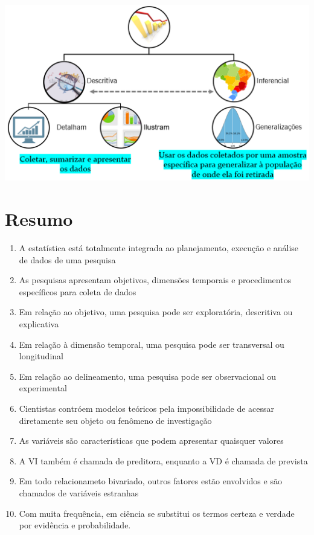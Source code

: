 \documentclass[
]{book}
\providecommand{\tightlist}{%
  \setlength{\itemsep}{0pt}\setlength{\parskip}{0pt}}
\begin{document}
\includegraphics{./img/cap_areas_estatistica.png}

\hypertarget{resumo-1}{%
\section{Resumo}\label{resumo-1}}

\begin{explore}

\begin{enumerate}
\def\labelenumi{\arabic{enumi}.}
\tightlist
\item
  A estatística está totalmente integrada ao planejamento, execução e análise de dados de uma pesquisa\\
\item
  As pesquisas apresentam objetivos, dimensões temporais e procedimentos específicos para coleta de dados\\
\item
  Em relação ao objetivo, uma pesquisa pode ser exploratória, descritiva ou explicativa\\
\item
  Em relação à dimensão temporal, uma pesquisa pode ser transversal ou longitudinal\\
\item
  Em relação ao delineamento, uma pesquisa pode ser observacional ou experimental\\
\item
  Cientistas contróem modelos teóricos pela impossibilidade de acessar diretamente seu objeto ou fenômeno de investigação\\
\item
  As variáveis são características que podem apresentar quaisquer valores\\
\item
  A VI também é chamada de preditora, enquanto a VD é chamada de prevista\\
\item
  Em todo relacionameto bivariado, outros fatores estão envolvidos e são chamados de variáveis estranhas\\
\item
  Com muita frequência, em ciência se substitui os termos certeza e verdade por evidência e probabilidade.
\end{enumerate}

\end{explore}
\end{document}
